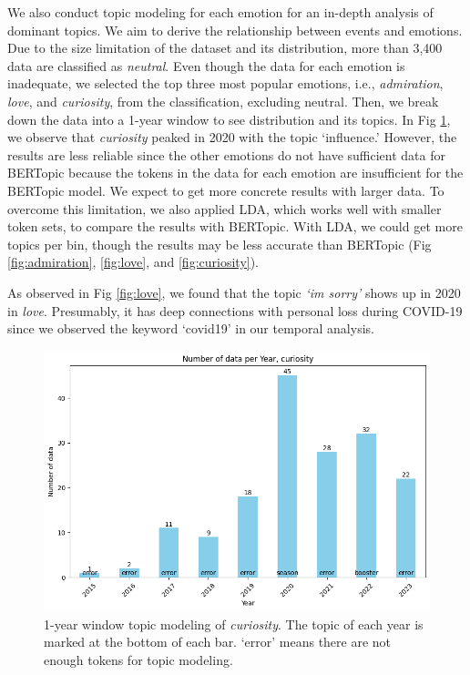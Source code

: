 \documentclass[conference,compsoc]{IEEEtran}
\begin{document}
We also conduct topic modeling for each emotion for an in-depth analysis of dominant topics. We aim to derive the relationship between events and emotions. Due to the size limitation of the dataset and its distribution, more than 3,400 data are classified as \textit{neutral}. Even though the data for each emotion is inadequate, we selected the top three most popular emotions, i.e., \textit{admiration}, \textit{love}, and \textit{curiosity}, from the classification, excluding neutral. Then, we break down the data into a 1-year window to see distribution and its topics. In Fig \ref{fig:curiosity_uni}, we observe that \textit{curiosity} peaked in 2020 with the topic `influence.' However, the results are less reliable since the other emotions do not have sufficient data for BERTopic because the tokens in the data for each emotion are insufficient for the BERTopic model. We expect to get more concrete results with larger data. To overcome this limitation, we also applied LDA, which works well with smaller token sets, to compare the results with BERTopic. With LDA, we could get more topics per bin, though the results may be less accurate than BERTopic (Fig \ref{fig:admiration}, \ref{fig:love}, and \ref{fig:curiosity}). 

As observed in Fig \ref{fig:love}, we found that the topic \textit{`im sorry'} shows up in 2020 in \textit{love}. Presumably, it has deep connections with personal loss during COVID-19 since we observed the keyword `covid19' in our temporal analysis. 

\begin{figure}[h!]
\includegraphics[width=\columnwidth]{figs/curiosity.png}
\caption{1-year window topic modeling of \textit{curiosity}. The topic of each year is marked at the bottom of each bar. `error' means there are not enough tokens for topic modeling.}
\label{fig:curiosity_uni}
\end{figure}
\end{document}

